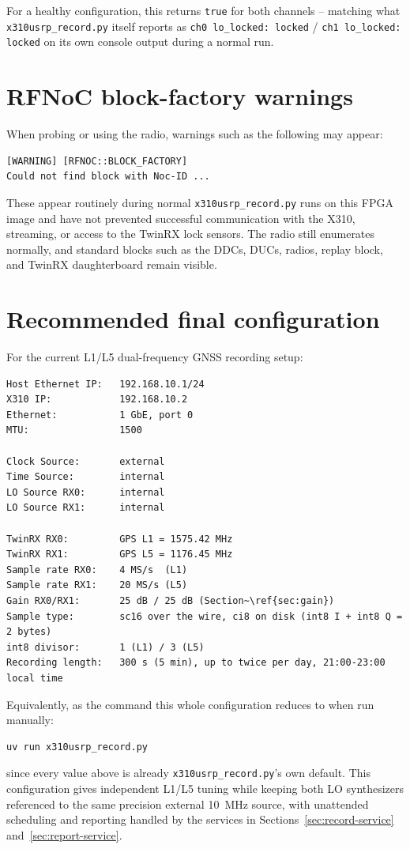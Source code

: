 \documentclass[11pt,a4paper]{article}
\begin{document}
For a healthy configuration, this returns \texttt{true} for both channels -- matching what \texttt{x310usrp\_record.py} itself reports as \texttt{ch0 lo\_locked: locked} / \texttt{ch1 lo\_locked: locked} on its own console output during a normal run.

\section{RFNoC block-factory warnings}

When probing or using the radio, warnings such as the following may appear:

\begin{lstlisting}
[WARNING] [RFNOC::BLOCK_FACTORY]
Could not find block with Noc-ID ...
\end{lstlisting}

These appear routinely during normal \texttt{x310usrp\_record.py} runs on this FPGA image and have not prevented successful communication with the X310, streaming, or access to the TwinRX lock sensors. The radio still enumerates normally, and standard blocks such as the DDCs, DUCs, radios, replay block, and TwinRX daughterboard remain visible.

\section{Recommended final configuration}

For the current L1/L5 dual-frequency GNSS recording setup:

\begin{lstlisting}
Host Ethernet IP:   192.168.10.1/24
X310 IP:            192.168.10.2
Ethernet:           1 GbE, port 0
MTU:                1500

Clock Source:       external
Time Source:        internal
LO Source RX0:      internal
LO Source RX1:      internal

TwinRX RX0:         GPS L1 = 1575.42 MHz
TwinRX RX1:         GPS L5 = 1176.45 MHz
Sample rate RX0:    4 MS/s  (L1)
Sample rate RX1:    20 MS/s (L5)
Gain RX0/RX1:       25 dB / 25 dB (Section~\ref{sec:gain})
Sample type:        sc16 over the wire, ci8 on disk (int8 I + int8 Q = 2 bytes)
int8 divisor:       1 (L1) / 3 (L5)
Recording length:   300 s (5 min), up to twice per day, 21:00-23:00 local time
\end{lstlisting}

Equivalently, as the command this whole configuration reduces to when run manually:

\begin{lstlisting}[language=bash]
uv run x310usrp_record.py
\end{lstlisting}

since every value above is already \texttt{x310usrp\_record.py}'s own default. This configuration gives independent L1/L5 tuning while keeping both LO synthesizers referenced to the same precision external 10~MHz source, with unattended scheduling and reporting handled by the services in Sections~\ref{sec:record-service} and~\ref{sec:report-service}.
\end{document}
